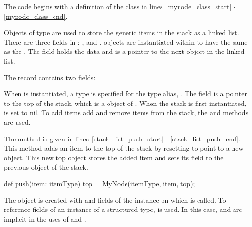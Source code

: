 The code begins with a definition of the  class in 
lines~\ref{mynode_class_start} - \ref{mynode_class_end}.  
\begin{chapel}
class MyNode {                      
  type itemType;                   
  var item: itemType;             
  var next: MyNode(itemType);    
\end{chapel}
Objects of type  are used to store the generic items in the stack
as a linked list.  There are three fields in :  , 
 and
.   objects are instantiated within  to
have the same  as the .  The  field
holds the data and  is a pointer to the next  object
in the linked list.

The  record contains two fields:
\begin{chapel}
record Stack {                      
  type itemType;                   
  var top: MyNode(itemType);      
\end{chapel}
When  is instantiated, a type is specified for the type
alias, .  The  field is a pointer to the top
of the stack, which is a  object of .  When
the stack is first instantiated,  is set to nil.  To add items
add and remove items from the stack, the  and  
methods are used.

The  method is given in lines~\ref{stack_list_push_start} -
\ref{stack_list_push_end}.  This method adds an item to the top of the stack
by resetting  to point to a new  object.  This new
top object stores the added item and sets its  field to the previous
 object of the stack.
\begin{chapel}
  def push(item: itemType) {        
    top = MyNode(itemType, item, top); 
  }                                 
\end{chapel}
The  object is created with  and  fields
of the  instance on which  is called.  To reference
fields of an instance of a structured type,  is used.
In this case,  and  are 
implicit in the uses of  and . 

